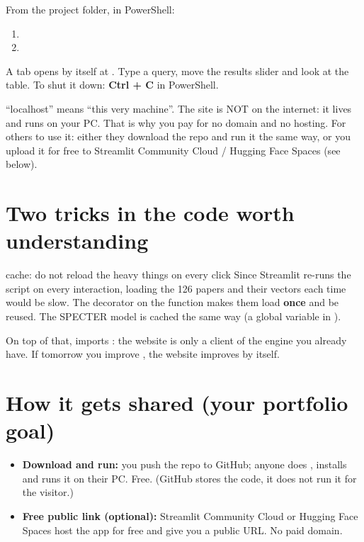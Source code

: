 \documentclass[11pt,a4paper]{article}
\begin{document}
\begin{practica}
From the project folder, in PowerShell:
\begin{enumerate}
  \item {}
  \item {}
\end{enumerate}
A tab opens by itself at . Type a query, move the results slider
and look at the table. To shut it down: \textbf{Ctrl + C} in PowerShell.
\end{practica}

\begin{ojo}
``localhost'' means ``this very machine''. The site is NOT on the internet: it lives and runs
on your PC. That is why you pay for no domain and no hosting. For others to use it: either
they download the repo and run it the same way, or you upload it for free to Streamlit
Community Cloud / Hugging Face Spaces (see below).
\end{ojo}

\section{Two tricks in the code worth understanding}

\begin{concepto}{cache: do not reload the heavy things on every click}
Since Streamlit re-runs the script on every interaction, loading the 126 papers and their
vectors each time would be slow. The  decorator on the
 function makes them load \textbf{once} and be reused. The SPECTER model
is cached the same way (a global variable in ).
\end{concepto}

On top of that,  imports : the website
is only a client of the engine you already have. If tomorrow you improve
, the website improves by itself.

\section{How it gets shared (your portfolio goal)}

\begin{itemize}
  \item \textbf{Download and run:} you push the repo to GitHub; anyone does ,
        installs  and runs it on their PC. Free. (GitHub stores the
        code, it does not run it for the visitor.)
  \item \textbf{Free public link (optional):} Streamlit Community Cloud or Hugging Face Spaces
        host the app for free and give you a public URL. No paid domain.
\end{itemize}
\end{document}
